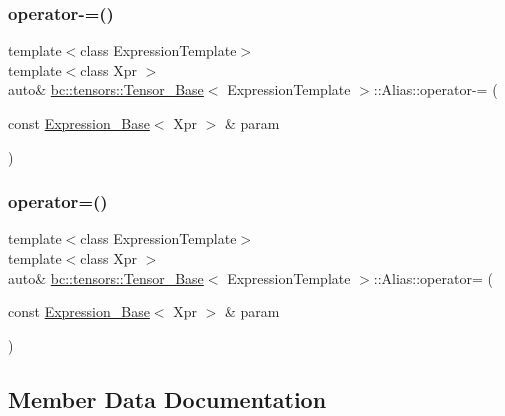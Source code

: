 \subsubsection{\texorpdfstring{operator-\/=()}{operator-=()}}
{\footnotesize\ttfamily template$<$class Expression\+Template$>$ \\
template$<$class Xpr $>$ \\
auto\& \hyperlink{classbc_1_1tensors_1_1Tensor__Base}{bc\+::tensors\+::\+Tensor\+\_\+\+Base}$<$ Expression\+Template $>$\+::Alias\+::operator-\/= (\begin{DoxyParamCaption}\item[{const \hyperlink{classbc_1_1tensors_1_1Expression__Base}{Expression\+\_\+\+Base}$<$ Xpr $>$ \&}]{param }\end{DoxyParamCaption})\hspace{0.3cm}{\ttfamily [inline]}}

\mbox{\label{structbc_1_1tensors_1_1Tensor__Base_1_1Alias_aabbc3f738288104c07bfa77fe68de2fe}} 
\subsubsection{\texorpdfstring{operator=()}{operator=()}}
{\footnotesize\ttfamily template$<$class Expression\+Template$>$ \\
template$<$class Xpr $>$ \\
auto\& \hyperlink{classbc_1_1tensors_1_1Tensor__Base}{bc\+::tensors\+::\+Tensor\+\_\+\+Base}$<$ Expression\+Template $>$\+::Alias\+::operator= (\begin{DoxyParamCaption}\item[{const \hyperlink{classbc_1_1tensors_1_1Expression__Base}{Expression\+\_\+\+Base}$<$ Xpr $>$ \&}]{param }\end{DoxyParamCaption})\hspace{0.3cm}{\ttfamily [inline]}}



\subsection{Member Data Documentation}
\mbox{\label{structbc_1_1tensors_1_1Tensor__Base_1_1Alias_ad5750b0c21936ec7e177648a831d06b4}} 
